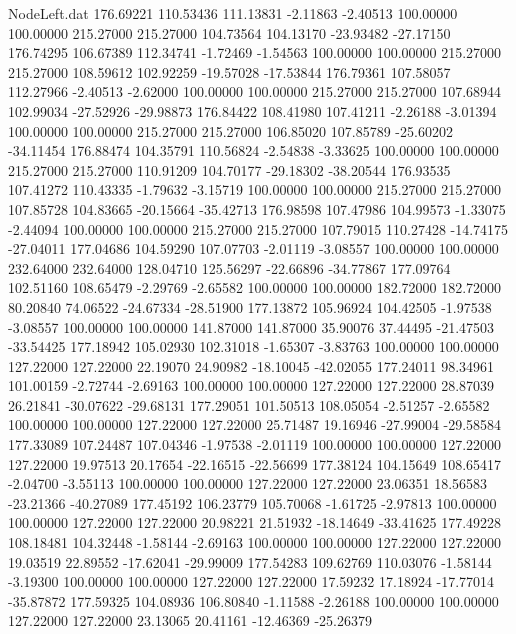 \begin{filecontents}{NodeLeft.dat}
 176.69221  110.53436  111.13831    -2.11863   -2.40513  100.00000  100.00000  215.27000  215.27000  104.73564  104.13170  -23.93482  -27.17150
 176.74295  106.67389  112.34741    -1.72469   -1.54563  100.00000  100.00000  215.27000  215.27000  108.59612  102.92259  -19.57028  -17.53844
 176.79361  107.58057  112.27966    -2.40513   -2.62000  100.00000  100.00000  215.27000  215.27000  107.68944  102.99034  -27.52926  -29.98873
 176.84422  108.41980  107.41211    -2.26188   -3.01394  100.00000  100.00000  215.27000  215.27000  106.85020  107.85789  -25.60202  -34.11454
 176.88474  104.35791  110.56824    -2.54838   -3.33625  100.00000  100.00000  215.27000  215.27000  110.91209  104.70177  -29.18302  -38.20544
 176.93535  107.41272  110.43335    -1.79632   -3.15719  100.00000  100.00000  215.27000  215.27000  107.85728  104.83665  -20.15664  -35.42713
 176.98598  107.47986  104.99573    -1.33075   -2.44094  100.00000  100.00000  215.27000  215.27000  107.79015  110.27428  -14.74175  -27.04011
 177.04686  104.59290  107.07703    -2.01119   -3.08557  100.00000  100.00000  232.64000  232.64000  128.04710  125.56297  -22.66896  -34.77867
 177.09764  102.51160  108.65479    -2.29769   -2.65582  100.00000  100.00000  182.72000  182.72000   80.20840   74.06522  -24.67334  -28.51900
 177.13872  105.96924  104.42505    -1.97538   -3.08557  100.00000  100.00000  141.87000  141.87000   35.90076   37.44495  -21.47503  -33.54425
 177.18942  105.02930  102.31018    -1.65307   -3.83763  100.00000  100.00000  127.22000  127.22000   22.19070   24.90982  -18.10045  -42.02055
 177.24011   98.34961  101.00159    -2.72744   -2.69163  100.00000  100.00000  127.22000  127.22000   28.87039   26.21841  -30.07622  -29.68131
 177.29051  101.50513  108.05054    -2.51257   -2.65582  100.00000  100.00000  127.22000  127.22000   25.71487   19.16946  -27.99004  -29.58584
 177.33089  107.24487  107.04346    -1.97538   -2.01119  100.00000  100.00000  127.22000  127.22000   19.97513   20.17654  -22.16515  -22.56699
 177.38124  104.15649  108.65417    -2.04700   -3.55113  100.00000  100.00000  127.22000  127.22000   23.06351   18.56583  -23.21366  -40.27089
 177.45192  106.23779  105.70068    -1.61725   -2.97813  100.00000  100.00000  127.22000  127.22000   20.98221   21.51932  -18.14649  -33.41625
 177.49228  108.18481  104.32448    -1.58144   -2.69163  100.00000  100.00000  127.22000  127.22000   19.03519   22.89552  -17.62041  -29.99009
 177.54283  109.62769  110.03076    -1.58144   -3.19300  100.00000  100.00000  127.22000  127.22000   17.59232   17.18924  -17.77014  -35.87872
 177.59325  104.08936  106.80840    -1.11588   -2.26188  100.00000  100.00000  127.22000  127.22000   23.13065   20.41161  -12.46369  -25.26379

\end{filecontents}
